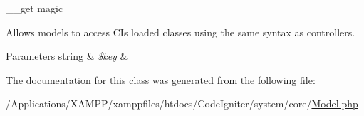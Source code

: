 \+\_\+\+\_\+get magic

Allows models to access CI\textquotesingle{}s loaded classes using the same syntax as controllers.


\begin{DoxyParams}[1]{Parameters}
string & {\em \$key} & \\
\hline
\end{DoxyParams}


The documentation for this class was generated from the following file\+:\begin{DoxyCompactItemize}
\item 
/\+Applications/\+X\+A\+M\+P\+P/xamppfiles/htdocs/\+Code\+Igniter/system/core/\mbox{\hyperlink{_model_8php}{Model.\+php}}\end{DoxyCompactItemize}
